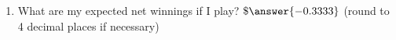 \documentclass{ximera}
\begin{document}
\begin{enumerate}
\begin{enumerate}
\begin{multipleChoice}
\end{multipleChoice}

\item What are my expected net winnings if I play?  $\$\answer{-0.3333}$ (round to 4 decimal places if necessary)

\end{enumerate}




\end{enumerate}





 
 
 
 
      
\end{document}
